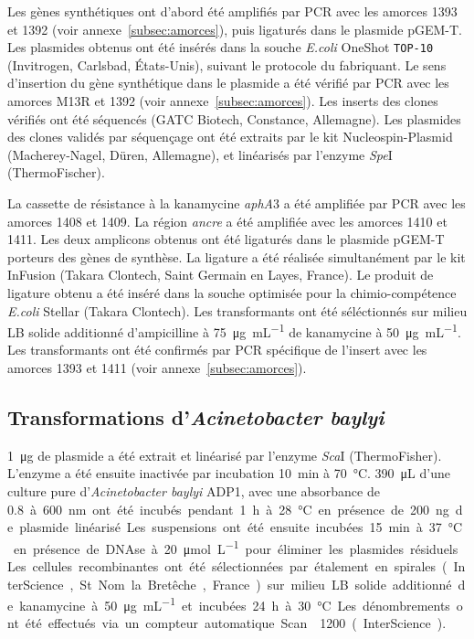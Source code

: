 Les gènes synthétiques ont d'abord été amplifiés par PCR avec les amorces 1393
et 1392 (voir annexe~\ref{subsec:amorces}), puis ligaturés dans le plasmide
pGEM-T. Les plasmides obtenus ont été insérés dans la souche \emph{E.coli}
OneShot\textsuperscript{{\textregistered}} \texttt{TOP-10} (Invitrogen,
Carlsbad, États-Unis), suivant le protocole du fabriquant. Le sens d'insertion
du gène synthétique dans le plasmide a été vérifié par PCR avec les amorces M13R
et 1392 (voir annexe~\ref{subsec:amorces}). Les inserts des clones vérifiés ont
été séquencés (GATC Biotech, Constance, Allemagne). Les plasmides des clones
validés par séquençage ont été extraits par le kit Nucleospin-Plasmid
(Macherey-Nagel, Düren, Allemagne), et linéarisés par l'enzyme \emph{Spe}I
(ThermoFischer).

La cassette de résistance à la kanamycine \emph{aphA}3 a été amplifiée par PCR
avec les amorces 1408 et 1409. La région \emph{ancre} a été amplifiée avec les
amorces 1410 et 1411. Les deux amplicons obtenus ont été ligaturés dans le
plasmide pGEM-T porteurs des gènes de synthèse. La ligature a été réalisée
simultanément par le kit InFusion (Takara Clontech, Saint Germain en Layes,
France). Le produit de ligature obtenu a été inséré dans la souche optimisée
pour la chimio-compétence \emph{E.coli} Stellar (Takara Clontech). Les
transformants ont été séléctionnés sur milieu LB solide additionné d'ampicilline
à \SI{75}{\ug\per\mL} de kanamycine à \SI{50}{\ug\per\mL}. Les transformants ont
été confirmés par PCR spécifique de l'insert avec les amorces 1393 et 1411 (voir
annexe~\ref{subsec:amorces}).

\subsection{Transformations d'\emph{Acinetobacter baylyi}}
\label{subsec:transfo}

\SI{1}{\ug} de plasmide a été extrait et linéarisé par l'enzyme \emph{Sca}I
(ThermoFisher). L'enzyme a été ensuite inactivée par incubation \SI{10}{\minute}
à \SI{70}{\celsius}. \SI{390}{\uL} d'une culture pure d'\emph{Acinetobacter
  baylyi} ADP1, avec une absorbance de \SI{0,8} à \SI{600}{\nm} ont été incubés
pendant \SI{1}{\hour} à \SI{28}{\celsius} en présence de \SI{200}{\ng} de
plasmide linéarisé. Les suspensions ont été ensuite incubées \SI{15}{\minute} à
\SI{37}{\celsius} en présence de DNAse à \SI{20}{\umol\per\L} pour éliminer les
plasmides résiduels. Les cellules recombinantes ont été sélectionnées par
étalement en spirales (InterScience, St Nom la Bretêche, France) sur milieu LB
solide additionné de kanamycine à \SI{50}{\ug\per\mL} et incubées \SI{24}{\hour}
à \SI{30}{\celsius}. Les dénombrements ont été effectués via un compteur
automatique Scan\textsuperscript{\textregistered}1200 (InterScience).

